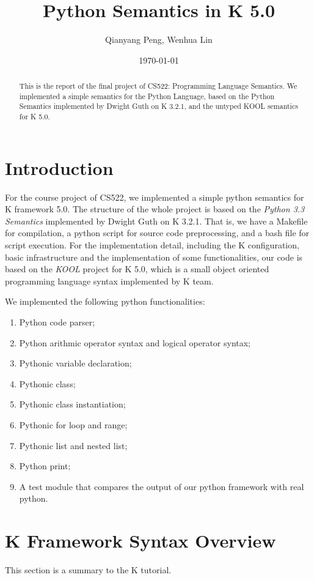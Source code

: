 \documentclass[a4paper]{article}
\title{Python Semantics in K 5.0}
\author{Qianyang Peng, Wenhua Lin}
\date{\today}
\begin{document}
\maketitle

\begin{abstract}
This is the report of the final project of CS522: Programming Language Semantics. We implemented a simple semantics for the Python Language, based on the Python Semantics implemented by Dwight Guth on K 3.2.1, and the untyped KOOL semantics for K 5.0.
\end{abstract}

\section{Introduction}
For the course project of CS522, we implemented a simple python semantics for K framework 5.0. The structure of the whole project is based on the \emph{Python 3.3 Semantics} implemented by Dwight Guth on K 3.2.1. That is, we have a Makefile for compilation, a python script for source code preprocessing, and a bash file for script execution. For the implementation detail, including the K configuration, basic infrastructure and the implementation of some functionalities, our code is based on the \emph{KOOL} project for K 5.0, which is a small object oriented programming language syntax implemented by K team.

We implemented the following python functionalities:

\begin{enumerate}
    \item Python code parser;
    \item Python arithmic operator syntax and logical operator syntax;
    \item Pythonic variable declaration;
    \item Pythonic class;
    \item Pythonic class instantiation;
    \item Pythonic for loop and range;
    \item Pythonic list and nested list;
    \item Python print;
    \item A test module that compares the output of our python framework with real python.
\end{enumerate}

\section{K Framework Syntax Overview}
This section is a summary to the K tutorial.
\end{document}
